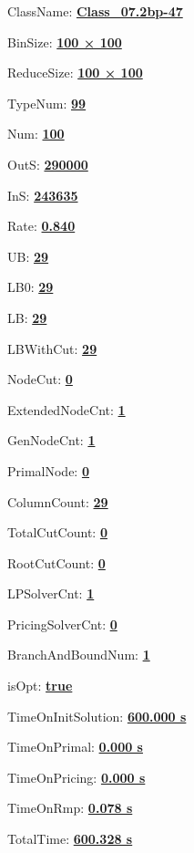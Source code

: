 \documentclass[11pt]{article}
\begin{document}
\pagestyle{empty}


ClassName: \underline{\textbf{Class_07.2bp-47}}
\par
BinSize: \underline{\textbf{100 × 100}}
\par
ReduceSize: \underline{\textbf{100 × 100}}
\par
TypeNum: \underline{\textbf{99}}
\par
Num: \underline{\textbf{100}}
\par
OutS: \underline{\textbf{290000}}
\par
InS: \underline{\textbf{243635}}
\par
Rate: \underline{\textbf{0.840}}
\par
UB: \underline{\textbf{29}}
\par
LB0: \underline{\textbf{29}}
\par
LB: \underline{\textbf{29}}
\par
LBWithCut: \underline{\textbf{29}}
\par
NodeCut: \underline{\textbf{0}}
\par
ExtendedNodeCnt: \underline{\textbf{1}}
\par
GenNodeCnt: \underline{\textbf{1}}
\par
PrimalNode: \underline{\textbf{0}}
\par
ColumnCount: \underline{\textbf{29}}
\par
TotalCutCount: \underline{\textbf{0}}
\par
RootCutCount: \underline{\textbf{0}}
\par
LPSolverCnt: \underline{\textbf{1}}
\par
PricingSolverCnt: \underline{\textbf{0}}
\par
BranchAndBoundNum: \underline{\textbf{1}}
\par
isOpt: \underline{\textbf{true}}
\par
TimeOnInitSolution: \underline{\textbf{600.000 s}}
\par
TimeOnPrimal: \underline{\textbf{0.000 s}}
\par
TimeOnPricing: \underline{\textbf{0.000 s}}
\par
TimeOnRmp: \underline{\textbf{0.078 s}}
\par
TotalTime: \underline{\textbf{600.328 s}}
\par
\newpage


\end{document}
